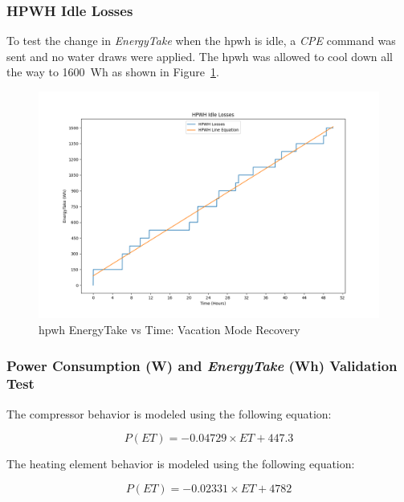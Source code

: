 \newpage

\subsubsection{HPWH Idle Losses}
To test the change in \textit{EnergyTake} when the \gls{hpwh} is idle, a \textit{CPE} command was sent and no water draws were applied. The \gls{hpwh} was allowed to cool down all the way to 1600~Wh as shown in Figure~\ref{fig:hpwh_idle_losses}.
\begin{figure}[htp!]
    \centering
    \includegraphics[width=0.99\columnwidth]{Pictures/hpwh_idle_losses.png}
    \caption{\gls{hpwh} EnergyTake vs Time: Vacation Mode Recovery}
    \label{fig:hpwh_idle_losses}
\end{figure}

\newpage

\subsubsection{Power Consumption (W) and \textit{EnergyTake} (Wh) Validation Test}

The compressor behavior is modeled using the following equation:

\begin{equation}\label{eq:cop_nov_lines_fit_}
    P(ET) = -0.04729 \times ET + 447.3
\end{equation}

The heating element behavior is modeled using the following equation:


\begin{equation}\label{eq:cop_nov_lines_fi_t}
    P(ET) = -0.02331 \times ET + 4782
\end{equation}

